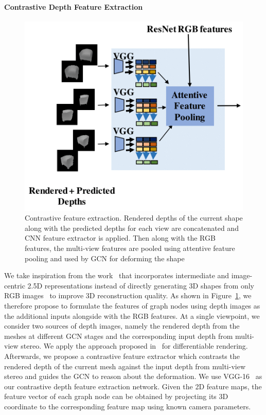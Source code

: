 \paragraph{Contrastive Depth Feature Extraction}\vspace{-4mm}
\begin{figure}[th!]
    \begin{center}
        \includegraphics[width=0.8\linewidth]{imgs/contrastive_feature_extractor.png}
    \end{center}
        \caption{Contrastive feature extraction. Rendered depths of the current shape along with the predicted depths for each view are concatenated and CNN feature extractor is applied. Then along with the RGB features, the multi-view features are pooled using attentive feature pooling and used by GCN for deforming the shape}
        \label{fig:contrastive_feature_extractor}
\end{figure}

We take inspiration from the work~\cite{yao2020front2back} that incorporates intermediate and image-centric 2.5D representations instead of directly generating 3D shapes from only RGB images~\cite{wang2018pixel2mesh,wen2019pixel2mesh++} to improve 3D reconstruction quality.
As shown in Figure~\ref{fig:contrastive_feature_extractor}, we therefore propose to formulate the features of graph nodes using depth images as the additional inputs alongside with the RGB features.
At a single viewpoint, we consider two sources of depth images, namely the rendered depth from the meshes at different GCN stages and the corresponding input depth from multi-view stereo.
We apply the approach proposed in~\cite{kato2018renderer} for differentiable rendering.
Afterwards, we propose a contrastive feature extractor which contrasts the rendered depth of the current mesh against the input depth from multi-view stereo and guides the GCN to reason about the deformation.
We use VGG-16~\cite{simonyan2014vgg} as our contrastive depth feature extraction network.
Given the 2D feature maps, the feature vector of each graph node can be obtained by projecting its 3D coordinate to the corresponding feature map using known camera parameters.

